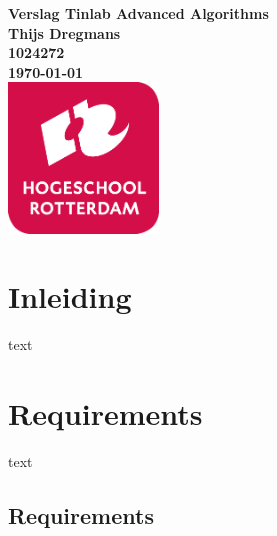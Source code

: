 \documentclass{article}
\begin{document}
	\sffamily
	
	\begin{titlepage}
	
		\centering
		  \vfill
		  {\bfseries\Huge
		    Verslag Tinlab Advanced Algorithms \\
		      \vskip2cm
		    }
		    {\bfseries\Large
		      Thijs Dregmans\\
		    }
		    {
		      \bfseries\normalsize
		      1024272\\
		      \vskip1cm
		      \today\\
		  }    
		  \vfill
		  \includegraphics[width=4cm]{logohr.png} %
		  \vfill
		  \vfill
	    
	\end{titlepage}
	
	\newpage
	
	
	\tableofcontents
	
	\newpage
	
	
	\section{Inleiding}
	
	text
	
	\newpage
	
	
	\section{Requirements}
	
		text
		
		\subsection{Requirements}
		
\end{document}
